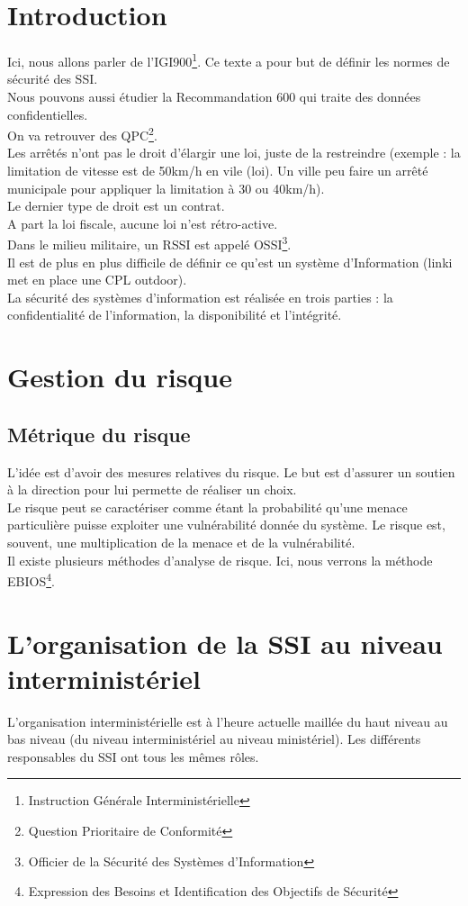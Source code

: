 \section{Introduction}
Ici, nous allons parler de l'IGI900\footnote{Instruction Générale Interministérielle}. Ce texte a pour but de définir les normes de sécurité des SSI.\\
Nous pouvons aussi étudier la Recommandation 600 qui traite des données confidentielles.\\
On va retrouver des QPC\footnote{Question Prioritaire de Conformité}.\\
Les arrêtés n'ont pas le droit d'élargir une loi, juste de la restreindre (exemple : la limitation de vitesse est de 50km/h en vile (loi). Un ville peu faire un arrêté municipale pour appliquer la limitation à 30 ou 40km/h).\\
Le dernier type de droit est un contrat.\\
A part la loi fiscale, aucune loi n'est rétro-active.\\
Dans le milieu militaire, un RSSI est appelé OSSI\footnote{Officier de la Sécurité des Systèmes d'Information}.\\
Il est de plus en plus difficile de définir ce qu'est un système d'Information (linki met en place une CPL outdoor).\\
La sécurité des systèmes d'information est réalisée en trois parties : la confidentialité de l'information, la disponibilité et l'intégrité.
\section{Gestion du risque}
\subsection{Métrique du risque}
L'idée est d'avoir des mesures relatives du risque. Le but est d'assurer un soutien à la direction pour lui permette de réaliser un choix.\\
Le risque peut se caractériser comme étant la probabilité qu'une menace particulière puisse exploiter une vulnérabilité donnée du système. Le risque est, souvent, une multiplication de la menace et de la vulnérabilité.\\
Il existe plusieurs méthodes d'analyse de risque. Ici, nous verrons la méthode EBIOS\footnote{Expression des Besoins et Identification des Objectifs de Sécurité}.
\section{L'organisation de la SSI au niveau interministériel}
L'organisation interministérielle est à l'heure actuelle maillée du haut niveau au bas niveau (du niveau interministériel au niveau ministériel). Les différents responsables du SSI ont tous les mêmes rôles.
